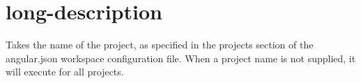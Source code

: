 \chapter{long-\/description}
\hypertarget{md__d_1_2_g_i_t_2_food_link_2foodlink_8client_2node__modules_2_0dangular_2cli_2src_2commands_2test_2long-description}{}\label{md__d_1_2_g_i_t_2_food_link_2foodlink_8client_2node__modules_2_0dangular_2cli_2src_2commands_2test_2long-description}
Takes the name of the project, as specified in the {\ttfamily projects} section of the {\ttfamily angular.\+json} workspace configuration file. When a project name is not supplied, it will execute for all projects. 